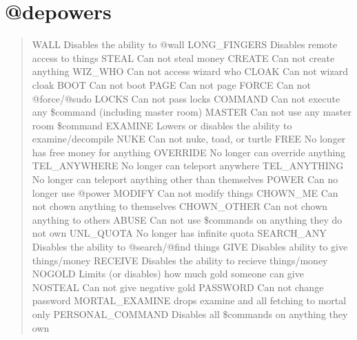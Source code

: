 \documentclass[letterpaper,10pt,english]{sphinxmanual}
\begin{document}
\section{@depowers}
\label{\detokenize{08-lockdown:depowers}}\begin{quote}

\sphinxAtStartPar
WALL               \sphinxhyphen{} Disables the ability to @wall
LONG\_FINGERS       \sphinxhyphen{} Disables remote access to things
STEAL              \sphinxhyphen{} Can not steal money
CREATE             \sphinxhyphen{} Can not create anything
WIZ\_WHO            \sphinxhyphen{} Can not access wizard who
CLOAK              \sphinxhyphen{} Can not wizard cloak
BOOT               \sphinxhyphen{} Can not boot
PAGE               \sphinxhyphen{} Can not page
FORCE              \sphinxhyphen{} Can not @force/@sudo
LOCKS              \sphinxhyphen{} Can not pass locks
COMMAND            \sphinxhyphen{} Can not execute any \$command (including master room)
MASTER             \sphinxhyphen{} Can not use any master room \$command
EXAMINE            \sphinxhyphen{} Lowers or disables the ability to examine/decompile
NUKE               \sphinxhyphen{} Can not nuke, toad, or turtle
FREE               \sphinxhyphen{} No longer has free money for anything
OVERRIDE           \sphinxhyphen{} No longer can override anything
TEL\_ANYWHERE       \sphinxhyphen{} No longer can teleport anywhere
TEL\_ANYTHING       \sphinxhyphen{} No longer can teleport anything other than themselves
POWER              \sphinxhyphen{} Can no longer use @power
MODIFY             \sphinxhyphen{} Can not modify things
CHOWN\_ME           \sphinxhyphen{} Can not chown anything to themselves
CHOWN\_OTHER        \sphinxhyphen{} Can not chown anything to others
ABUSE              \sphinxhyphen{} Can not use \$commands on anything they do not own
UNL\_QUOTA          \sphinxhyphen{} No longer has infinite quota
SEARCH\_ANY         \sphinxhyphen{} Disables the ability to @search/@find things
GIVE               \sphinxhyphen{} Disables ability to give things/money
RECEIVE            \sphinxhyphen{} Disables the ability to recieve things/money
NOGOLD             \sphinxhyphen{} Limits (or disables) how much gold someone can give
NOSTEAL            \sphinxhyphen{} Can not give negative gold
PASSWORD           \sphinxhyphen{} Can not change password
MORTAL\_EXAMINE     \sphinxhyphen{} drops examine and all fetching to mortal only
PERSONAL\_COMMAND   \sphinxhyphen{} Disables all \$commands on anything they own
\end{quote}
\end{document}
